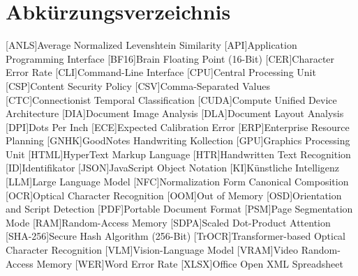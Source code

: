 \chapter{Abkürzungsverzeichnis}

\begin{acronym}[SHA-256]
  [ANLS]{Average Normalized Levenshtein Similarity}
  [API]{Application Programming Interface}
  [BF16]{Brain Floating Point (16-Bit)}
  [CER]{Character Error Rate}
  [CLI]{Command-Line Interface}
  [CPU]{Central Processing Unit}
  [CSP]{Content Security Policy}
  [CSV]{Comma-Separated Values}
  [CTC]{Connectionist Temporal Classification}
  [CUDA]{Compute Unified Device Architecture}
  [DIA]{Document Image Analysis}
  [DLA]{Document Layout Analysis}
  [DPI]{Dots Per Inch}
  [ECE]{Expected Calibration Error}
  [ERP]{Enterprise Resource Planning}
  [GNHK]{GoodNotes Handwriting Kollection}
  [GPU]{Graphics Processing Unit}
  [HTML]{HyperText Markup Language}
  [HTR]{Handwritten Text Recognition}
  [ID]{Identifikator}
  [JSON]{JavaScript Object Notation}
  [KI]{Künstliche Intelligenz}
  [LLM]{Large Language Model}
  [NFC]{Normalization Form Canonical Composition}
  [OCR]{Optical Character Recognition}
  [OOM]{Out of Memory}
  [OSD]{Orientation and Script Detection}
  [PDF]{Portable Document Format}
  [PSM]{Page Segmentation Mode}
  [RAM]{Random-Access Memory}
  [SDPA]{Scaled Dot-Product Attention}
  [SHA-256]{Secure Hash Algorithm (256-Bit)}
  [TrOCR]{Transformer-based Optical Character Recognition}
  [VLM]{Vision-Language Model}
  [VRAM]{Video Random-Access Memory}
  [WER]{Word Error Rate}
  [XLSX]{Office Open XML Spreadsheet}
\end{acronym}
